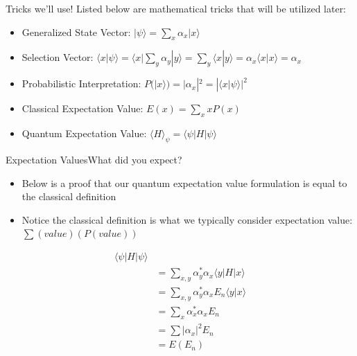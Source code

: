 \begin{frame}{Tricks we'll use!}{}
Listed below are mathematical tricks that will be utilized later:

\vspace{8mm}


    \begin{itemize}

        \item Generalized State Vector: $| \psi \rangle = \sum_{x}{\alpha_x  | x\rangle}$ 
        \vspace{2mm}
        \item  Selection Vector: $\langle x | \psi \rangle =  \langle x | \sum_{y} \alpha_{y} | y \rangle = \sum_{y} \langle x | y \rangle = \alpha_x \langle x | x \rangle = \alpha_x$ 
        \vspace{2mm}
        \item Probabilistic Interpretation: $P(|x\rangle) = |\alpha_x|^2 = |\langle x | \psi \rangle | ^2$
        \vspace{2mm}
        \item Classical Expectation Value: $E(x) = \sum_x xP(x)  $
        \vspace{2mm}
        \item  Quantum Expectation Value: $\langle H \rangle_\psi =  \langle \psi | H | \psi \rangle $
        
    \end{itemize}
        
   
   
\end{frame}

\begin{frame}{Expectation Values}{What did you expect?}
\begin{itemize}
    \item Below is a proof that our quantum expectation value formulation is equal to the classical definition
    \item Notice the classical definition is what we typically consider expectation value: $\sum (value)(P(value))$
\end{itemize}

\vspace{-7mm}
\begin{align*}
     \langle \psi | H | \psi \rangle \\
     &= \sum_{x,y} \alpha_y^* \alpha_x \langle y | H | x \rangle \\
     &= \sum_{x,y} \alpha_y^* \alpha_x E_n \langle y | x \rangle \\
     &= \sum_x \alpha_x^* \alpha_x E_n \\
     &= \sum |\alpha_x|^2 E_n \\
     &= E(E_n)
\end{align*}

\end{frame}




